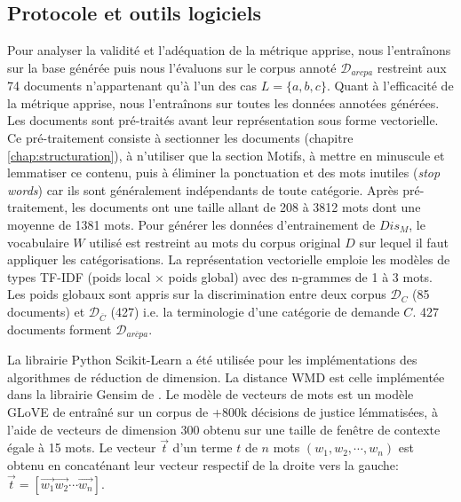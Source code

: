 \subsection{Protocole et outils logiciels}
Pour analyser la validité et l'adéquation de la métrique apprise, nous l'entraînons sur la base générée puis nous l'évaluons sur le corpus annoté $\mathcal{D}_{arcpa}$ restreint aux 74 documents n'appartenant qu'à l'un des cas $L = \lbrace a, b, c \rbrace$. Quant à l'efficacité de la métrique apprise, nous l'entraînons sur toutes les données annotées générées. Les documents sont pré-traités avant leur représentation sous forme vectorielle. Ce pré-traitement consiste à sectionner les documents (chapitre \ref{chap:structuration}), à n'utiliser que la section Motifs, à mettre en minuscule et lemmatiser ce contenu, puis à éliminer la ponctuation et des mots inutiles (\textit{stop words})  car ils sont généralement indépendants de toute catégorie. Après pré-traitement, les documents ont une taille allant de 208 à 3812 mots dont une moyenne de 1381 mots. Pour générer les données  d'entrainement de $Dis_M$, le vocabulaire $W$ utilisé est restreint au mots du corpus original $D$ sur lequel il faut appliquer les catégorisations. La représentation vectorielle emploie les modèles de types TF-IDF (poids local $\times$ poids global) avec des n-grammes de 1 à 3 mots. %
Les poids globaux sont appris sur la discrimination entre deux corpus $\mathcal{D}_{C}$ (85 documents) et $\mathcal{D}_{\overline{C}}$ (427) i.e. la terminologie d'une catégorie de demande $C$. 427 documents forment $\mathcal{D}_{\overline{arcpa}}$.

 La librairie Python Scikit-Learn \citep{Pedregosa2011scikit-learn} a été utilisée pour les implémentations des algorithmes de réduction de dimension. La distance WMD est celle implémentée dans la librairie Gensim de \citet{rehurek2010gensim}. Le modèle de vecteurs de mots est un modèle GLoVE de \citet{pennington2014glove} entraîné sur un corpus de +800k décisions de justice lémmatisées, à l'aide de vecteurs de dimension 300 obtenu sur une taille de fenêtre de contexte égale à 15 mots. Le vecteur $\vec{t}$ d'un terme $t$ de $n$ mots $(w_1, w_2, \cdots, w_n)$ est obtenu en concaténant leur vecteur respectif de la droite vers la gauche: $\vec{t}=[\vec{w_1}\vec{w_2}\cdots \vec{w_n}]$.

